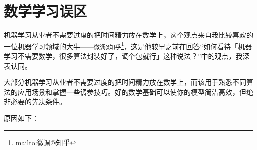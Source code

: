 \documentclass[]{ctexbook}
\renewcommand{\href}[2]{#2\footnote{\url{#1}}}
\begin{document}
\hypertarget{ux6570ux5b66ux5b66ux4e60ux8befux533a}{%
\section{数学学习误区}\label{ux6570ux5b66ux5b66ux4e60ux8befux533a}}

机器学习从业者不需要过度的把时间精力放在数学上，这个观点来自我比较喜欢的一位机器学习领域的大牛------\href{mailto:微调@知乎}{\nolinkurl{微调@知乎}}，这是他较早之前在回答``如何看待「机器学习不需要数学，很多算法封装好了，调个包就行」这种说法？''中的观点，我深表认同。

大部分机器学习从业者不需要过度的把时间精力放在数学上，而该用于熟悉不同算法的应用场景和掌握一些调参技巧。好的数学基础可以使你的模型简洁高效，但绝非必要的先决条件。

原因如下：
\end{document}

